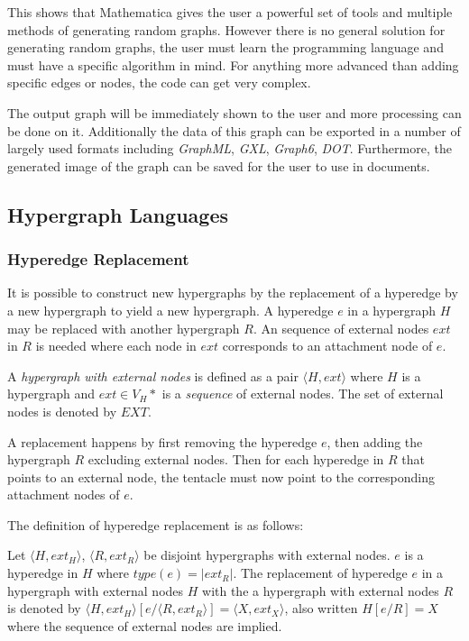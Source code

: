     

    This shows that Mathematica gives the user a powerful set of tools and multiple methods of generating random graphs. However there is no general solution for generating random graphs, the user must learn the programming language and must have a specific algorithm in mind. For anything more advanced than adding specific edges or nodes, the code can get very complex.

    The output graph will be immediately shown to the user and more processing can be done on it. Additionally the data of this graph can be exported in a number of largely used formats including \emph{GraphML}, \emph{GXL}, \emph{Graph6}, \emph{DOT}. Furthermore, the generated image of the graph can be saved for the user to use in documents.

\subsection{Hypergraph Languages}
  \subsubsection{Hyperedge Replacement}

    It is possible to construct new hypergraphs by the replacement of a hyperedge by a new hypergraph to yield a new hypergraph. A hyperedge $e$ in a hypergraph $H$ may be replaced with another hypergraph $R$. An sequence of external nodes $ext$ in $R$ is needed where each node in $ext$ corresponds to an attachment node of $e$.

    A \emph{hypergraph with external nodes} is defined as a pair $\langle H, ext \rangle$ where $H$ is a hypergraph and $ext \in V_H*$ is a \emph{sequence} of external nodes. The set of external nodes is denoted by $EXT$.

    A replacement happens by first removing the hyperedge $e$, then adding the hypergraph $R$ excluding external nodes. Then for each hyperedge in $R$ that points to an external node, the tentacle must now point to the corresponding attachment nodes of $e$.

    The definition of hyperedge replacement is as follows:

    Let $\langle H, ext_H \rangle$, $\langle R, ext_R \rangle$ be disjoint hypergraphs with external nodes. $e$ is a hyperedge in $H$ where $type(e) = |ext_R|$. The replacement of hyperedge $e$ in a hypergraph with external nodes $H$ with the a hypergraph with external nodes $R$ is denoted by $\langle H, ext_H \rangle[e/\langle R, ext_R\rangle] = \langle X, ext_X \rangle$, also written $H[e/R] = X$ where the sequence of external nodes are implied. 

